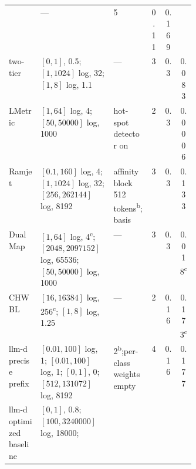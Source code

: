 \begin{table}[tbp]
\begin{tabularx}{\linewidth}{@{}P{0.17\linewidth}YP{0.2\linewidth}ccc@{}}
      & --- & 5 & 0.11 & 0.169 \\
    \addlinespace
    two-tier
      &  $[0, 1]$, 0.5;\newline {} $[1, 1024]$ log, 32;\newline
         $[1, 8]$ log, 1.1
      & --- & 3 & 0.3 & 0.083 \\
    \addlinespace
    LMetric
      &  $[1, 64]$ log, 4;\newline {} $[50, \num{50000}]$ log, 1000
      & hot-spot detector on & 2 & 0.3 & 0.0006 \\
    \addlinespace
    Ramjet
      &  $[0.1, 160]$ log, 4;\newline {} $[1, 1024]$ log, 32;\newline
         $[256, \num{262144}]$ log, 8192
      & affinity block 512 tokens\textsuperscript{b};\newline basis  & 3 & 0.3 & 0.133 \\
    \addlinespace
    DualMap
      &  $[1, 64]$ log, 4\textsuperscript{c};\newline
         $[2048, \num{2097152}]$ log, \num{65536};\newline
         $[50, \num{50000}]$ log, 1000
      & --- & 3 & 0.3 & 0.018\textsuperscript{c} \\
    \addlinespace
    CHWBL
      &  $[16, \num{16384}]$ log, 256\textsuperscript{c};\newline {} $[1, 8]$ log, 1.25
      & --- & 2 & 0.16 & 0.173\textsuperscript{c} \\
    \addlinespace
    llm-d precise prefix
      &  $[0.01, 100]$ log, 1;\newline {} $[0.01, 100]$ log, 1;\newline
         $[0, 1]$, 0;\newline
         $[512, \num{131072}]$ log, 8192
      &  2\textsuperscript{b};\newline per-class weights empty & 4 & 0.16 & 0.177 \\
    \addlinespace
    llm-d optimized baseline
      &  $[0, 1]$, 0.8;\newline {} $[100, \num{3240000}]$ log, \num{18000};\newline

\end{tabularx}
\end{table}
